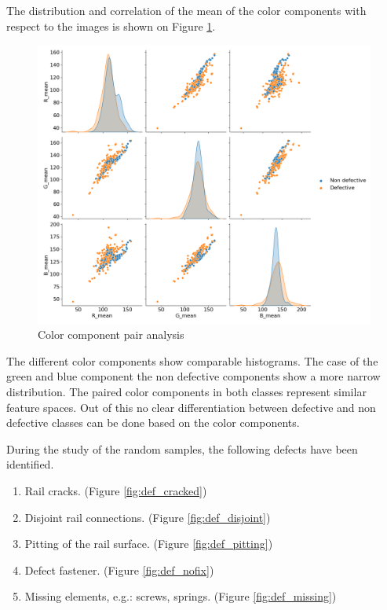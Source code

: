 \documentclass[10pt, final]{article}
\begin{document}
The distribution and correlation of the mean of the color components with respect to the images is shown on
Figure \ref{fig:comp_pair}.

\begin{figure}[!ht]
	\centering
	\includegraphics[width=\textwidth]{./tex_graphs/comp_pair.png}
	\caption{Color component pair analysis}
	\label{fig:comp_pair}
\end{figure}

The different color components show comparable histograms.
The case of the green and blue component the non defective components show a more narrow distribution.
The paired color components in both classes represent similar feature spaces.
Out of this no clear differentiation between defective and non defective classes can be done based on the color components.

During the study of the random samples, the following defects have been identified.

\begin{enumerate}
	\item Rail cracks. (Figure \ref{fig:def_cracked})
	\item Disjoint rail connections. (Figure \ref{fig:def_disjoint})
	\item Pitting of the rail surface. (Figure \ref{fig:def_pitting})
	\item Defect fastener. (Figure \ref{fig:def_nofix})
	\item Missing elements, e.g.: screws, springs. (Figure \ref{fig:def_missing})
\end{enumerate}
\end{document}
